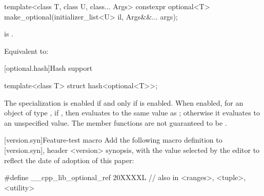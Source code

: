 %
\begin{itemdecl}
template<class T, class U, class... Args>
  constexpr optional<T> make_optional(initializer_list<U> il, Args&&... args);
\end{itemdecl}

\begin{itemdescr}
\begin{addedblock}
\pnum
\mandates
{} is .
\end{addedblock}

\pnum
\effects
Equivalent to: 
\end{itemdescr}


[optional.hash]{Hash support}
%
\begin{itemdecl}
template<class T> struct hash<optional<T>>;
\end{itemdecl}

\begin{itemdescr}
\pnum
The specialization  is enabled
if and only if   is enabled.
When enabled, for an object  of type ,
if , then 
evaluates to the same value as ;
otherwise it evaluates to an unspecified value.
The member functions are not guaranteed to be .
\end{itemdescr}

\begin{addedblock}
[version.syn]{Feature-test macro}
Add the following macro definition to [version.syn], header <version> synopsis, with the value selected by the editor to reflect the date of adoption of this paper:

\begin{codeblock}
  #define __cpp_lib_optional_ref 20XXXXL // also in <ranges>, <tuple>, <utility>
\end{codeblock}
\end{addedblock}

